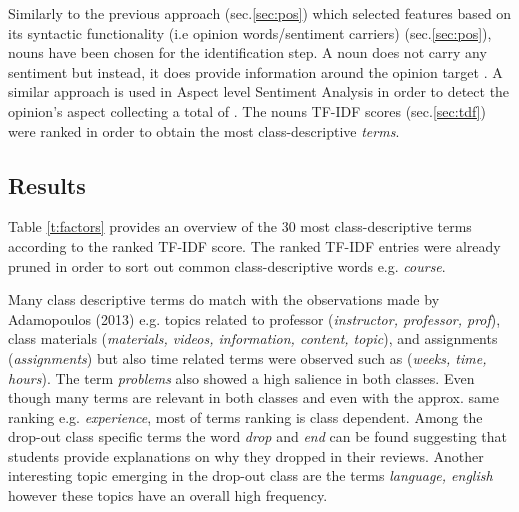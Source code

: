 \documentclass[
	a4paper,
	pdftex,
	12pt,	
	footinclude=true,
	fleqn,
	final,
	]{report}%
\begin{document}
Similarly to the previous approach (sec.\ref{sec:pos}) which selected features
based on its syntactic functionality (i.e opinion words/sentiment carriers) (sec.\ref{sec:pos}),
nouns have been chosen for the identification step. 
A noun does not carry any sentiment \cite{Pang2008,Liu2012} 
but instead, it does provide information around 
the opinion target \cite{Pang2002}.
A similar approach is used in Aspect level Sentiment Analysis in order 
to detect the opinion's aspect \cite{Liu2012} collecting a total of 
. 
The nouns TF-IDF scores (sec.\ref{sec:tdf}) 
were ranked in order to obtain the most class-descriptive \emph{terms}. 

\vspace{-0.45cm}
\subsection*{Results}
\vspace{-0.45cm}
Table \ref{t:factors} provides an overview of the 30 most 
class-descriptive terms according to the ranked TF-IDF score. 
The ranked TF-IDF entries were already pruned in order to 
sort out common class-descriptive words e.g. \emph{course}.

Many class descriptive terms do match with the observations 
made by Adamopoulos (2013) e.g. topics related to 
professor (\emph{instructor, professor, prof}), 
class materials (\emph{materials, videos, information, content, topic}), 
and assignments (\emph{assignments}) but also 
time related terms were observed such as (\emph{weeks, time, hours}). 
The term \emph{problems} also showed a high salience in both classes.
Even though many terms are relevant in both classes and even 
with the approx. same ranking e.g. \emph{experience}, 
most of terms ranking is class dependent. Among the drop-out class
specific terms the word \emph{drop} and \emph{end} can be found
suggesting that students provide explanations on why they dropped 
in their reviews. Another interesting topic emerging in the 
drop-out class are the terms \emph{language, english} 
however these topics have an overall high frequency. 
\vspace{-0.3cm}
\end{document}
